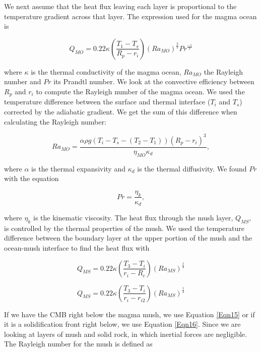 \documentclass[fleqn,usenatbib]{mnras}
\begin{document}
We next assume that the heat flux leaving each layer is proportional to the temperature gradient across that layer. The expression used for the magma ocean is

\begin{equation}
\label{Eqn12}
Q_{MO} = 0.22 \kappa \left(\frac{T_{1} - T_{s}}{R_{p} - r_{i}}\right) \left(Ra_{MO}\right)^{\frac{2}{7}} Pr^{\frac{-1}{7}}
\end{equation}

\noindent where $\kappa$ is the thermal conductivity of the magma ocean, $Ra_{MO}$ the Rayleigh number and $Pr$ its Prandtl number. We look at the convective efficiency between $R_{p}$ and $r_{i}$ to compute the Rayleigh number of the magma ocean. We used the temperature difference between the surface and thermal interface ($T_{i}$ and $T_{s}$) corrected by the adiabatic gradient. We get the sum of this difference when calculating the Rayleigh number:

\begin{equation}
\label{Eqn13}
Ra_{MO} = \frac{ \alpha \rho g \left(T_{i} - T_{s} - (T_{2} - T_{1}) \right) \left(R_{p} - r_{i}\right)^{3}}{\eta_{MO} \kappa _{d}},
\end{equation}

\noindent where $\alpha$ is the thermal expansivity and $\kappa_{d}$ is the thermal diffusivity. We found $Pr$ with the equation

\begin{equation}
\label{Eqn14}
Pr = \frac{\eta_{k}}{\kappa_{d}}, 
\end{equation}

\noindent where $\eta_{k}$ is the kinematic viscosity. The heat flux through the mush layer, $Q_{MS}$, is controlled by the thermal properties of the mush. We used the temperature difference between the boundary layer at the upper portion of the mush and the ocean-mush interface to find the heat flux with 

\begin{equation}
\label{Eqn15}
Q_{MS} = 0.22 \kappa \left(\frac{T_{3} - T_{i}}{r_{i} - R_{c}}\right) \left(Ra_{MS}\right)^{\frac{1}{3}}
\end{equation}

\begin{equation}
\label{Eqn16}
Q_{MS} = 0.22 \kappa \left(\frac{T_{3} - T_{i}}{r_{i} - r_{i2}}\right) \left(Ra_{MS}\right)^{\frac{1}{3}}
\end{equation}

\noindent If we have the CMB right below the magma mush, we use Equation \ref{Eqn15} or if it is a solidification front right below, we use Equation \ref{Eqn16}. Since we are looking at layers of mush and solid rock, in which inertial forces are negligible. The Rayleigh number for the mush is defined as 
\end{document}
